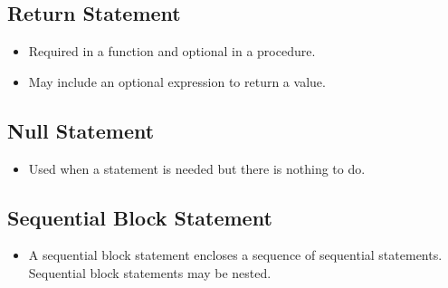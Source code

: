 \documentclass[a4paper,12pt]{article}
\begin{document}
	\subsection*{Return Statement}
	\begin{itemize}
		\item Required in a function and optional in a procedure.
		\item May include an optional expression to return a value.
	\end{itemize}
	
	\subsection*{Null Statement}
	\begin{itemize}
		\item Used when a statement is needed but there is nothing to do.
	\end{itemize}
	
	\subsection*{Sequential Block Statement}
	\begin{itemize}
		\item A sequential block statement encloses a sequence of sequential statements. Sequential block statements may
		be nested.
	\end{itemize}
	
	
	
	
	
	
	
	
	
\end{document}

